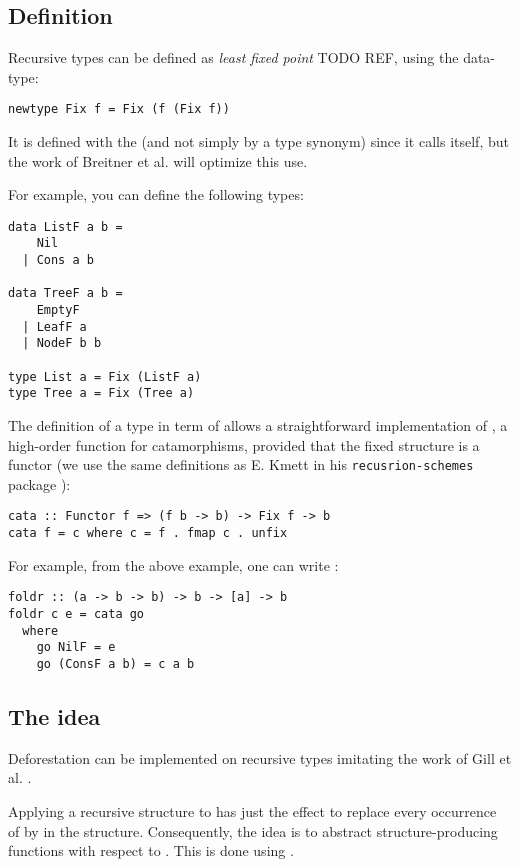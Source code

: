 
\subsection{Definition}
\label{sec:defi}
Recursive types can be defined as \emph{least fixed point} TODO REF, using the  data-type:
\begin{verbatim}
newtype Fix f = Fix (f (Fix f))
\end{verbatim}
It is defined with the  (and not simply by a type synonym) since it calls itself, but the work of Breitner et al. \cite{Breitner:2014:SZC:2692915.2628141} will optimize this use.

For example, you can define the following types:
\begin{verbatim}
data ListF a b =
    Nil
  | Cons a b
  
data TreeF a b =
    EmptyF
  | LeafF a
  | NodeF b b
  
type List a = Fix (ListF a)
type Tree a = Fix (Tree a)
\end{verbatim}

The definition of a type in term of  allows a straightforward implementation of , a high-order function for catamorphisms, provided that the fixed structure is a functor (we use the same definitions as E. Kmett in his \verb|recusrion-schemes| package \cite{ekmett:eschems}):
\begin{verbatim}
cata :: Functor f => (f b -> b) -> Fix f -> b
cata f = c where c = f . fmap c . unfix
\end{verbatim}

For example,  from the above example, one can write :
\begin{verbatim}
foldr :: (a -> b -> b) -> b -> [a] -> b
foldr c e = cata go
  where
    go NilF = e
    go (ConsF a b) = c a b
\end{verbatim}

\subsection{The idea}
Deforestation can be implemented on recursive types imitating the work of Gill et al. \cite{Gill:1993:SCD:165180.165214}.

Applying a recursive structure to  has just the effect to replace every occurrence of  by  in the structure. Consequently, the idea is to abstract structure-producing functions with respect to . This is done using .

